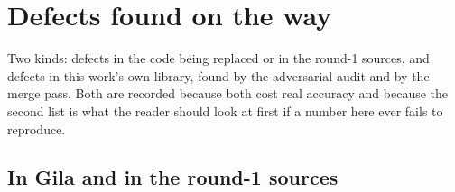 \section{Defects found on the way}
\label{sec:def}

Two kinds: defects in the code being replaced or in the round-1 sources, and defects in this
work's own library, found by the adversarial audit and by the merge pass. Both are recorded
because both cost real accuracy and because the second list is what the reader should look
at first if a number here ever fails to reproduce.

\subsection{In Gila and in the round-1 sources}

